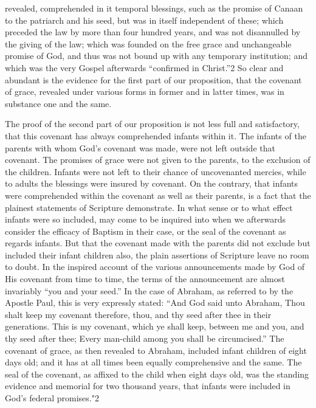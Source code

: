 \documentclass[]{book}
\begin{document}
revealed, comprehended in it temporal blessings, such as the promise of Canaan to the patriarch and his seed, but was in itself independent of these; which preceded the law by more than four hundred years, and was not disannulled by the giving of the law; which was founded on the free grace and unchangeable promise of God, and thus was not bound up with any temporary institution; and which was the very Gospel afterwards ``confirmed in Christ.''2 So clear and abundant is the evidence for the first part of our proposition, that the covenant of grace, revealed under various forms in former and in latter times, was in substance one and the same.

The proof of the second part of our proposition is not less full and satisfactory, that this covenant has always comprehended infants within it. The infants of the parents with whom God's covenant was made, were not left outside that covenant. The promises of grace were not given to the parents, to the exclusion of the children. Infants were not left to their chance of uncovenanted mercies, while to adults the blessings were insured by covenant. On the contrary, that infants were comprehended within the covenant as well as their parents, is a fact that the plainest statements of Scripture demonstrate. In what sense or to what effect infants were so included, may come to be inquired into when we afterwards consider the efficacy of Baptism in their case, or the seal of the covenant as regards infants. But that the covenant made with the parents did not exclude but included their infant children also, the plain assertions of Scripture leave no room to doubt. In the inspired account of the various announcements made by God of His covenant from time to time, the terms of the announcement are almost invariably ``you and your seed.'' In the case of Abraham, as referred to by the Apostle Paul, this is very expressly stated: ``And God said unto Abraham, Thou shalt keep my covenant therefore, thou, and thy seed after thee in their generations. This is my covenant, which ye shall keep, between me and you, and thy seed after thee; Every man-child among you shall be circumcised.'' The covenant of grace, as then revealed to Abraham, included infant children of eight days old; and it has at all times been equally comprehensive and the same. The seal of the covenant, as affixed to the child when eight days old, was the standing evidence and memorial for two thousand years, that infants were included in God's federal promises."2
\end{document}
